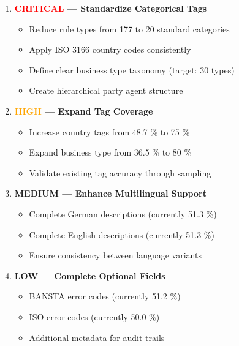 \begin{enumerate}[leftmargin=*,itemsep=6pt,topsep=4pt]
 \item \textbf{\textcolor{red}{CRITICAL} — Standardize Categorical Tags}
   \begin{itemize}[leftmargin=*,itemsep=2pt,topsep=2pt]
     \item Reduce rule types from 177 to 20 standard categories
     \item Apply ISO 3166 country codes consistently  
     \item Define clear business type taxonomy (target: 30 types)
     \item Create hierarchical party agent structure
   \end{itemize}
   
 \item \textbf{\textcolor{orange}{HIGH} — Expand Tag Coverage}
   \begin{itemize}[leftmargin=*,itemsep=2pt,topsep=2pt]
     \item Increase country tags from 48.7 \% to 75 \%
     \item Expand business type from 36.5 \% to 80 \%
     \item Validate existing tag accuracy through sampling
   \end{itemize}
   
 \item \textbf{\textcolor{yellow!50!black}{MEDIUM} — Enhance Multilingual Support}
   \begin{itemize}[leftmargin=*,itemsep=2pt,topsep=2pt]
     \item Complete German descriptions (currently 51.3 \%)
     \item Complete English descriptions (currently 51.3 \%)
     \item Ensure consistency between language variants
   \end{itemize}
   
 \item \textbf{\textcolor{green!50!black}{LOW} — Complete Optional Fields}
   \begin{itemize}[leftmargin=*,itemsep=2pt,topsep=2pt]
     \item BANSTA error codes (currently 51.2 \%)
     \item ISO error codes (currently 50.0 \%)
     \item Additional metadata for audit trails
   \end{itemize}
\end{enumerate}

